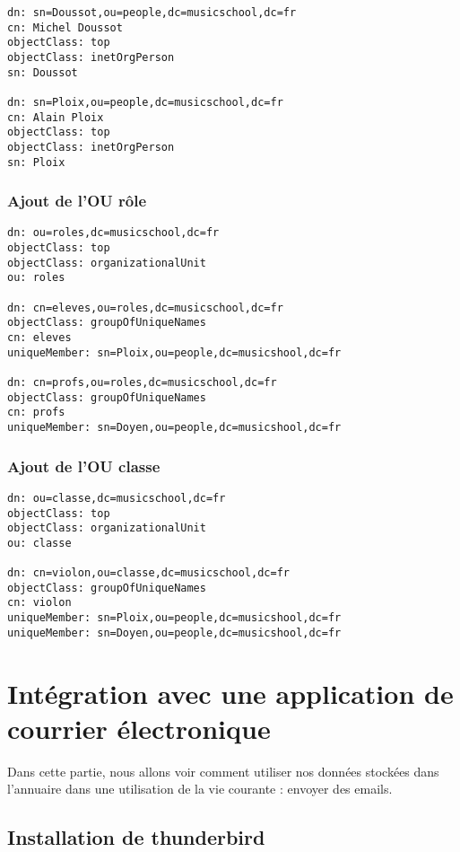 \documentclass[12pt,a4paper,notitlepage]{article}
\begin{document}
\begin{lstlisting}[title=people.ldif]
dn: sn=Doussot,ou=people,dc=musicschool,dc=fr
cn: Michel Doussot
objectClass: top
objectClass: inetOrgPerson
sn: Doussot

dn: sn=Ploix,ou=people,dc=musicschool,dc=fr
cn: Alain Ploix
objectClass: top
objectClass: inetOrgPerson
sn: Ploix
\end{lstlisting}

\subsubsection{Ajout de l'OU rôle}

\begin{lstlisting}[title=role.ldif]
dn: ou=roles,dc=musicschool,dc=fr
objectClass: top
objectClass: organizationalUnit
ou: roles

dn: cn=eleves,ou=roles,dc=musicschool,dc=fr
objectClass: groupOfUniqueNames
cn: eleves
uniqueMember: sn=Ploix,ou=people,dc=musicshool,dc=fr

dn: cn=profs,ou=roles,dc=musicschool,dc=fr
objectClass: groupOfUniqueNames
cn: profs
uniqueMember: sn=Doyen,ou=people,dc=musicshool,dc=fr
\end{lstlisting}

\subsubsection{Ajout de l'OU classe}

\begin{lstlisting}[title=classe.ldif]
dn: ou=classe,dc=musicschool,dc=fr
objectClass: top
objectClass: organizationalUnit
ou: classe

dn: cn=violon,ou=classe,dc=musicschool,dc=fr
objectClass: groupOfUniqueNames
cn: violon
uniqueMember: sn=Ploix,ou=people,dc=musicshool,dc=fr
uniqueMember: sn=Doyen,ou=people,dc=musicshool,dc=fr
\end{lstlisting}

\section{Intégration avec une application de courrier électronique}

Dans cette partie, nous allons voir comment utiliser nos données stockées dans l'annuaire dans une utilisation de la vie courante : envoyer des emails.
\subsection{Installation de thunderbird}
\end{document}
